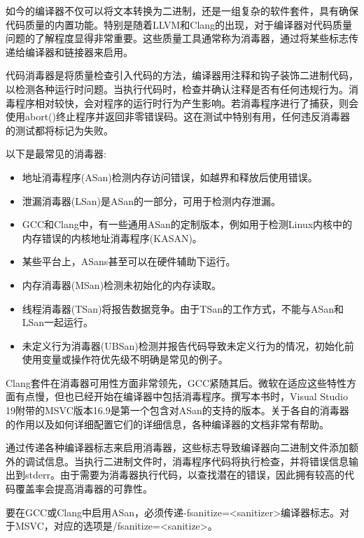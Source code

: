 如今的编译器不仅可以将文本转换为二进制，还是一组复杂的软件套件，具有确保代码质量的内置功能。特别是随着LLVM和Clang的出现，对于编译器对代码质量问题的了解程度显得非常重要。这些质量工具通常称为消毒器，通过将某些标志传递给编译器和链接器来启用。

代码消毒器是将质量检查引入代码的方法，编译器用注释和钩子装饰二进制代码，以检测各种运行时问题。当执行代码时，检查并确认注释是否有任何违规行为。消毒程序相对较快，会对程序的运行时行为产生影响。若消毒程序进行了捕获，则会使用abort()终止程序并返回非零错误码。这在测试中特别有用，任何违反消毒器的测试都将标记为失败。

以下是最常见的消毒器:

\begin{itemize}
\item 
地址消毒程序(ASan)检测内存访问错误，如越界和释放后使用错误。

\item 
泄漏消毒器(LSan)是ASan的一部分，可用于检测内存泄漏。

\item 
GCC和Clang中，有一些通用ASan的定制版本，例如用于检测Linux内核中的内存错误的内核地址消毒程序(KASAN)。

\item 
某些平台上，ASans甚至可以在硬件辅助下运行。

\item 
内存消毒器(MSan)检测未初始化的内存读取。

\item 
线程消毒器(TSan)将报告数据竞争。由于TSan的工作方式，不能与ASan和LSan一起运行。

\item 
未定义行为消毒器(UBSan)检测并报告代码导致未定义行为的情况，初始化前使用变量或操作符优先级不明确是常见的例子。
\end{itemize}

Clang套件在消毒器可用性方面非常领先，GCC紧随其后。微软在适应这些特性方面有点慢，但也已经开始在编译器中包括消毒程序。撰写本书时，Visual Studio 19附带的MSVC版本16.9是第一个包含对ASan的支持的版本。关于各自的消毒器的作用以及如何详细配置它们的详细信息，各种编译器的文档非常有帮助。

通过传递各种编译器标志来启用消毒器，这些标志导致编译器向二进制文件添加额外的调试信息。当执行二进制文件时，消毒程序代码将执行检查，并将错误信息输出到stderr。由于需要为消毒器执行代码，以查找潜在的错误，因此拥有较高的代码覆盖率会提高消毒器的可靠性。

要在GCC或Clang中启用ASan，必须传递-fsanitize=<sanitizer>编译器标志。对于MSVC，对应的选项是/fsanitize=<sanitize>。

